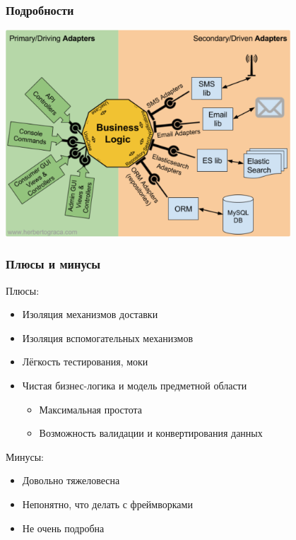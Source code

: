 \documentclass{../cscslides}
\begin{document}
    \begin{frame}
        \frametitle{Подробности}
        \begin{center}
            \includegraphics[width=0.8\textwidth]{hexagonalArchitectureDetails.png}
        \end{center}
    \end{frame}

    \begin{frame}
        \frametitle{Плюсы и минусы}
        Плюсы:
        \begin{itemize}
            \item Изоляция механизмов доставки
            \item Изоляция вспомогательных механизмов
            \item Лёгкость тестирования, моки
            \item Чистая бизнес-логика и модель предметной области
            \begin{itemize}
                \item Максимальная простота
                \item Возможность валидации и конвертирования данных
            \end{itemize}
        \end{itemize}
        \vspace{5mm}
        Минусы:
        \begin{itemize}
            \item Довольно тяжеловесна
            \item Непонятно, что делать с фреймворками
            \item Не очень подробна
        \end{itemize}
    \end{frame}
\end{document}
